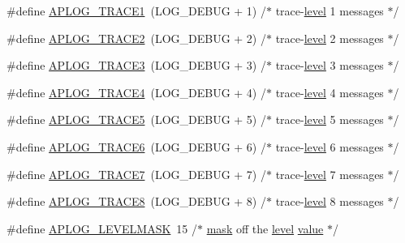 \begin{DoxyCompactItemize}
\item 
\#define \hyperlink{group__APACHE__CORE__LOG_gab08ab6d0e9ab24707ce7baeaecf1f551}{A\+P\+L\+O\+G\+\_\+\+T\+R\+A\+C\+E1}~(L\+O\+G\+\_\+\+D\+E\+B\+UG + 1)  /$\ast$ trace-\/\hyperlink{group__APACHE__CORE__LOG_ga46c1c4bc138aad1e20504bbee34f35a7}{level} 1 messages $\ast$/
\item 
\#define \hyperlink{group__APACHE__CORE__LOG_gaaa69603638ba4a5d83b8727a1ca5b76a}{A\+P\+L\+O\+G\+\_\+\+T\+R\+A\+C\+E2}~(L\+O\+G\+\_\+\+D\+E\+B\+UG + 2)  /$\ast$ trace-\/\hyperlink{group__APACHE__CORE__LOG_ga46c1c4bc138aad1e20504bbee34f35a7}{level} 2 messages $\ast$/
\item 
\#define \hyperlink{group__APACHE__CORE__LOG_ga5e4f134ae2203dd339774d9549d814db}{A\+P\+L\+O\+G\+\_\+\+T\+R\+A\+C\+E3}~(L\+O\+G\+\_\+\+D\+E\+B\+UG + 3)  /$\ast$ trace-\/\hyperlink{group__APACHE__CORE__LOG_ga46c1c4bc138aad1e20504bbee34f35a7}{level} 3 messages $\ast$/
\item 
\#define \hyperlink{group__APACHE__CORE__LOG_ga479289550d998526187ff78880378f9c}{A\+P\+L\+O\+G\+\_\+\+T\+R\+A\+C\+E4}~(L\+O\+G\+\_\+\+D\+E\+B\+UG + 4)  /$\ast$ trace-\/\hyperlink{group__APACHE__CORE__LOG_ga46c1c4bc138aad1e20504bbee34f35a7}{level} 4 messages $\ast$/
\item 
\#define \hyperlink{group__APACHE__CORE__LOG_gab1a4bc833fc60cfbb6bc89eaa6550a2c}{A\+P\+L\+O\+G\+\_\+\+T\+R\+A\+C\+E5}~(L\+O\+G\+\_\+\+D\+E\+B\+UG + 5)  /$\ast$ trace-\/\hyperlink{group__APACHE__CORE__LOG_ga46c1c4bc138aad1e20504bbee34f35a7}{level} 5 messages $\ast$/
\item 
\#define \hyperlink{group__APACHE__CORE__LOG_gad067edc2e8853edaa2a1b54792b62f87}{A\+P\+L\+O\+G\+\_\+\+T\+R\+A\+C\+E6}~(L\+O\+G\+\_\+\+D\+E\+B\+UG + 6)  /$\ast$ trace-\/\hyperlink{group__APACHE__CORE__LOG_ga46c1c4bc138aad1e20504bbee34f35a7}{level} 6 messages $\ast$/
\item 
\#define \hyperlink{group__APACHE__CORE__LOG_ga90c9ee0877e812054113ea3c9385a231}{A\+P\+L\+O\+G\+\_\+\+T\+R\+A\+C\+E7}~(L\+O\+G\+\_\+\+D\+E\+B\+UG + 7)  /$\ast$ trace-\/\hyperlink{group__APACHE__CORE__LOG_ga46c1c4bc138aad1e20504bbee34f35a7}{level} 7 messages $\ast$/
\item 
\#define \hyperlink{group__APACHE__CORE__LOG_ga08fc65b391ff4c007f69cd46f4423ac3}{A\+P\+L\+O\+G\+\_\+\+T\+R\+A\+C\+E8}~(L\+O\+G\+\_\+\+D\+E\+B\+UG + 8)  /$\ast$ trace-\/\hyperlink{group__APACHE__CORE__LOG_ga46c1c4bc138aad1e20504bbee34f35a7}{level} 8 messages $\ast$/
\item 
\#define \hyperlink{group__APACHE__CORE__LOG_gad670a9e39225b017388108507a432fd3}{A\+P\+L\+O\+G\+\_\+\+L\+E\+V\+E\+L\+M\+A\+SK}~15     /$\ast$ \hyperlink{group__APR__Util__Date_ga6bd7250007a3cfeadacf370fbf68cf5a}{mask} off the \hyperlink{group__APACHE__CORE__LOG_ga46c1c4bc138aad1e20504bbee34f35a7}{level} \hyperlink{pcretest_8txt_a262ad32c75be9b93a7a77b045ed14fe0}{value} $\ast$/

\end{DoxyCompactItemize}
